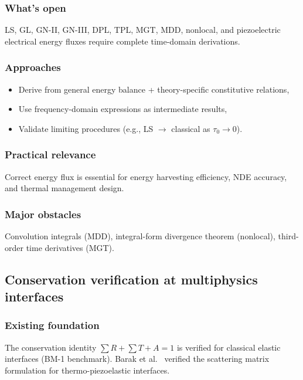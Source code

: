 \subsubsection{What's open}

LS, GL, GN-II, GN-III, DPL, TPL, MGT, MDD, nonlocal, and piezoelectric electrical energy fluxes require complete time-domain derivations.

\subsubsection{Approaches}

\begin{itemize}
\item Derive from general energy balance + theory-specific constitutive relations,
\item Use frequency-domain expressions as intermediate results,
\item Validate limiting procedures (e.g., LS $\to$ classical as $\tau_0 \to 0$).
\end{itemize}

\subsubsection{Practical relevance}

Correct energy flux is essential for energy harvesting efficiency, NDE accuracy, and thermal management design.

\subsubsection{Major obstacles}

Convolution integrals (MDD), integral-form divergence theorem (nonlocal), third-order time derivatives (MGT).

\subsection{Conservation verification at multiphysics interfaces}
\label{sec:15.2}

\subsubsection{Existing foundation}

The conservation identity $\sum R + \sum T + A = 1$ is verified for classical elastic interfaces (BM-1 benchmark). Barak et al.~\cite{Barak2023} verified the scattering matrix formulation for thermo-piezoelastic interfaces.

